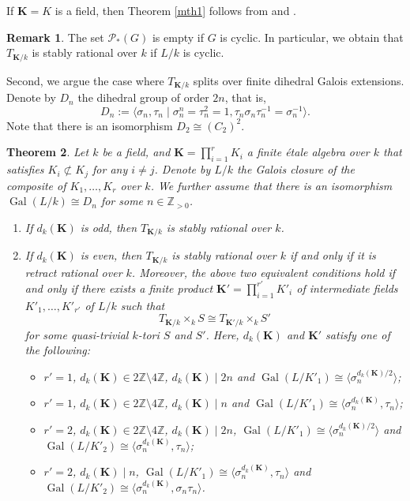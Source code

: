 \documentclass[12pt]{amsart}
\theoremstyle{plain}
\newtheorem{thm}{Theorem}[section]
\theoremstyle{definition}
\newtheorem{rem}[thm]{Remark}
\numberwithin{thm}{section}
\numberwithin{equation}{section}
\newcommand{\Zpn}{\mathbb{Z}_{>0}}
\newcommand{\Z}{\mathbb{Z}}
\newcommand{\bK}{\mathbf{K}}
\DeclareMathOperator{\Gal}{Gal}
\begin{document}
If $\bK=K$ is a field, then Theorem \ref{mth1} follows from \cite[Theorem 2.3]{Endo1975} and \cite[Theorem 3.1]{Endo2011}. 

\begin{rem}
The set $\mathscr{P}_{*}(G)$ is empty if $G$ is cyclic. In particular, we obtain that $T_{\bK/k}$ is stably rational over $k$ if $L/k$ is cyclic. 
\end{rem}

Second, we argue the case where $T_{\bK/k}$ splits over finite dihedral Galois extensions. Denote by $D_{n}$ the dihedral group of order $2n$, that is, 
\begin{equation*}
    D_{n}:=\langle \sigma_{n},\tau_{n}\mid \sigma_{n}^{n}=\tau_{n}^{2}=1,\tau_{n}\sigma_{n}\tau_{n}^{-1}=\sigma_{n}^{-1}\rangle. 
\end{equation*}
Note that there is an isomorphism $D_{2}\cong (C_{2})^{2}$. 

\begin{thm}\label{mth2}
Let $k$ be a field, and $\bK=\prod_{i=1}^{r}K_i$ a finite {\'e}tale algebra over $k$ that satisfies $K_{i}\not\subset K_{j}$ for any $i \neq j$. Denote by $L/k$ the Galois closure of the composite of $K_{1},\ldots,K_{r}$ over $k$. We further assume that there is an isomorphism $\Gal(L/k)\cong D_{n}$ for some $n\in \Zpn$. %
\begin{enumerate}
\item If $d_{k}(\bK)$ is odd, then $T_{\bK/k}$ is stably rational over $k$. 
\item If $d_{k}(\bK)$ is even, then $T_{\bK/k}$ is stably rational over $k$ if and only if it is retract rational over $k$. Moreover, the above two equivalent conditions hold if and only if there exists a finite product $\bK'=\prod_{i=1}^{r'}K'_{i}$ of intermediate fields $K'_{1},\ldots,K'_{r'}$ of $L/k$ such that 
\begin{equation*}
    T_{\bK/k}\times_{k}S\cong T_{\bK'/k}\times_{k}S'
\end{equation*}
for some quasi-trivial $k$-tori $S$ and $S'$. Here, $d_{k}(\bK)$ and $\bK'$ satisfy one of the following: 
\begin{itemize}
\item[(a)] $r'=1$, $d_{k}(\bK)\in 2\Z \setminus 4\Z$, $d_{k}(\bK)\mid 2n$ and $\Gal(L/K'_{1})\cong \langle \sigma_{n}^{d_{k}(\bK)/2}\rangle$; 
\item[(b)] $r'=1$, $d_{k}(\bK)\in 2\Z \setminus 4\Z$, $d_{k}(\bK)\mid n$ and $\Gal(L/K'_{1})\cong \langle \sigma_{n}^{d_{k}(\bK)},\tau_{n}\rangle$; 
\item[(c)] $r'=2$, $d_{k}(\bK)\in 2\Z \setminus 4\Z$, $d_{k}(\bK)\mid 2n$, $\Gal(L/K'_{1})\cong \langle \sigma_{n}^{d_{k}(\bK)/2}\rangle$ and $\Gal(L/K'_{2})\cong \langle \sigma_{n}^{d_{k}(\bK)},\tau_{n}\rangle$;
\item[(d)] $r'=2$, $d_{k}(\bK)\mid n$, $\Gal(L/K'_{1})\cong \langle \sigma_{n}^{d_{k}(\bK)},\tau_{n}\rangle$ and $\Gal(L/K'_{2})\cong \langle \sigma_{n}^{d_{k}(\bK)},\sigma_{n}\tau_{n}\rangle$. 
\end{itemize}
\end{enumerate}
\end{thm}
\end{document}
